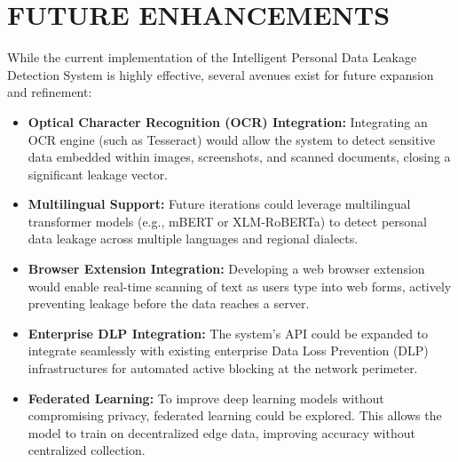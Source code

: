 \chapter{FUTURE ENHANCEMENTS}
\thispagestyle{fancy}
\hspace{0.5cm}
While the current implementation of the Intelligent Personal Data Leakage Detection System is highly effective, several avenues exist for future expansion and refinement:

\begin{itemize}
    \item \textbf{Optical Character Recognition (OCR) Integration:} Integrating an OCR engine (such as Tesseract) would allow the system to detect sensitive data embedded within images, screenshots, and scanned documents, closing a significant leakage vector.
    \item \textbf{Multilingual Support:} Future iterations could leverage multilingual transformer models (e.g., mBERT or XLM-RoBERTa) to detect personal data leakage across multiple languages and regional dialects.
    \item \textbf{Browser Extension Integration:} Developing a web browser extension would enable real-time scanning of text as users type into web forms, actively preventing leakage before the data reaches a server.
    \item \textbf{Enterprise DLP Integration:} The system's API could be expanded to integrate seamlessly with existing enterprise Data Loss Prevention (DLP) infrastructures for automated active blocking at the network perimeter.
    \item \textbf{Federated Learning:} To improve deep learning models without compromising privacy, federated learning could be explored. This allows the model to train on decentralized edge data, improving accuracy without centralized collection.
\end{itemize}
